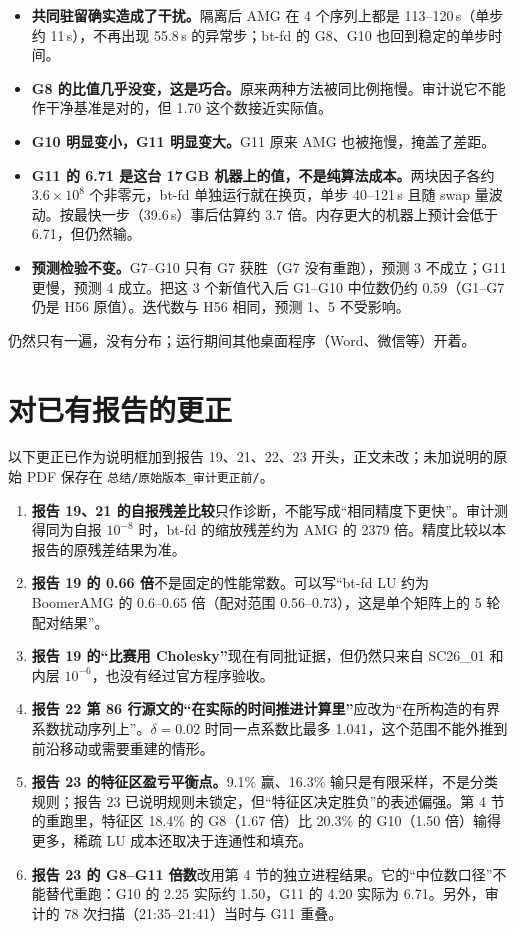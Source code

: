 \documentclass[11pt,a4paper]{ctexart}
\begin{document}
\begin{itemize}
\item \textbf{共同驻留确实造成了干扰。}隔离后 AMG 在 4 个序列上都是 113--120\,s（单步约 11\,s），不再出现 55.8\,s 的异常步；bt-fd 的 G8、G10 也回到稳定的单步时间。
\item \textbf{G8 的比值几乎没变，这是巧合。}原来两种方法被同比例拖慢。审计说它不能作干净基准是对的，但 1.70 这个数接近实际值。
\item \textbf{G10 明显变小，G11 明显变大。}G11 原来 AMG 也被拖慢，掩盖了差距。
\item \textbf{G11 的 6.71 是这台 17\,GB 机器上的值，不是纯算法成本。}两块因子各约 $3.6\times10^{8}$ 个非零元，bt-fd 单独运行就在换页，单步 40--121\,s 且随 swap 量波动。按最快一步（39.6\,s）事后估算约 3.7 倍。内存更大的机器上预计会低于 6.71，但仍然输。
\item \textbf{预测检验不变。}G7--G10 只有 G7 获胜（G7 没有重跑），预测 3 不成立；G11 更慢，预测 4 成立。把这 3 个新值代入后 G1--G10 中位数仍约 0.59（G1--G7 仍是 H56 原值）。迭代数与 H56 相同，预测 1、5 不受影响。
\end{itemize}
仍然只有一遍，没有分布；运行期间其他桌面程序（Word、微信等）开着。

\section{对已有报告的更正}
以下更正已作为说明框加到报告 19、21、22、23 开头，正文未改；未加说明的原始 PDF 保存在 \texttt{总结/原始版本\_审计更正前/}。
\begin{enumerate}
\item \textbf{报告 19、21 的自报残差比较}只作诊断，不能写成“相同精度下更快”。审计测得同为自报 $10^{-8}$ 时，bt-fd 的缩放残差约为 AMG 的 2379 倍。精度比较以本报告的原残差结果为准。
\item \textbf{报告 19 的 0.66 倍}不是固定的性能常数。可以写“bt-fd LU 约为 BoomerAMG 的 0.6--0.65 倍（配对范围 0.56--0.73），这是单个矩阵上的 5 轮配对结果”。
\item \textbf{报告 19 的“比赛用 Cholesky”}现在有同批证据，但仍然只来自 SC26\_01 和内层 $10^{-6}$，也没有经过官方程序验收。
\item \textbf{报告 22 第 86 行源文的“在实际的时间推进计算里”}应改为“在所构造的有界系数扰动序列上”。$\delta=0.02$ 时同一点系数比最多 1.041，这个范围不能外推到前沿移动或需要重建的情形。
\item \textbf{报告 23 的特征区盈亏平衡点。}9.1\% 赢、16.3\% 输只是有限采样，不是分类规则；报告 23 已说明规则未锁定，但“特征区决定胜负”的表述偏强。第 4 节的重跑里，特征区 18.4\% 的 G8（1.67 倍）比 20.3\% 的 G10（1.50 倍）输得更多，稀疏 LU 成本还取决于连通性和填充。
\item \textbf{报告 23 的 G8--G11 倍数}改用第 4 节的独立进程结果。它的“中位数口径”不能替代重跑：G10 的 2.25 实际约 1.50，G11 的 4.20 实际为 6.71。另外，审计的 78 次扫描（21:35--21:41）当时与 G11 重叠。
\end{enumerate}
\end{document}
